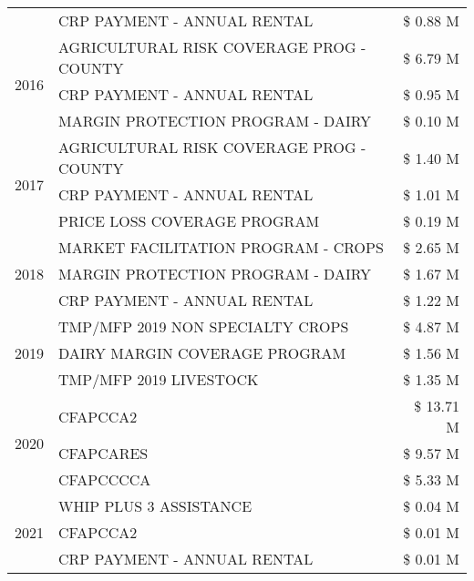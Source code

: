 \begin{tabular}{llr}
 & CRP PAYMENT - ANNUAL RENTAL & \$ 0.88 M \\
\cline{1-3}
\multirow[t]{3}{*}{2016} & AGRICULTURAL RISK COVERAGE PROG - COUNTY & \$ 6.79 M \\
 & CRP PAYMENT - ANNUAL RENTAL & \$ 0.95 M \\
 & MARGIN PROTECTION PROGRAM - DAIRY & \$ 0.10 M \\
\cline{1-3}
\multirow[t]{3}{*}{2017} & AGRICULTURAL RISK COVERAGE PROG - COUNTY & \$ 1.40 M \\
 & CRP PAYMENT - ANNUAL RENTAL & \$ 1.01 M \\
 & PRICE LOSS COVERAGE PROGRAM & \$ 0.19 M \\
\cline{1-3}
\multirow[t]{3}{*}{2018} & MARKET FACILITATION PROGRAM - CROPS & \$ 2.65 M \\
 & MARGIN PROTECTION PROGRAM - DAIRY & \$ 1.67 M \\
 & CRP PAYMENT - ANNUAL RENTAL & \$ 1.22 M \\
\cline{1-3}
\multirow[t]{3}{*}{2019} & TMP/MFP 2019 NON SPECIALTY CROPS & \$ 4.87 M \\
 & DAIRY MARGIN COVERAGE PROGRAM & \$ 1.56 M \\
 & TMP/MFP 2019 LIVESTOCK & \$ 1.35 M \\
\cline{1-3}
\multirow[t]{3}{*}{2020} & CFAPCCA2 & \$ 13.71 M \\
 & CFAPCARES & \$ 9.57 M \\
 & CFAPCCCCA & \$ 5.33 M \\
\cline{1-3}
\multirow[t]{3}{*}{2021} & WHIP PLUS 3 ASSISTANCE & \$ 0.04 M \\
 & CFAPCCA2 & \$ 0.01 M \\
 & CRP PAYMENT - ANNUAL RENTAL & \$ 0.01 M \\
\cline{1-3}
\bottomrule
\end{tabular}
